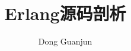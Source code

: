 \documentclass[a4paper, 11pt]{book}
\begin{document}
\title{Erlang源码剖析}
\author{Dong Guanjun}
\maketitle
\tableofcontents





\appendix



\newpage
\end{document}
